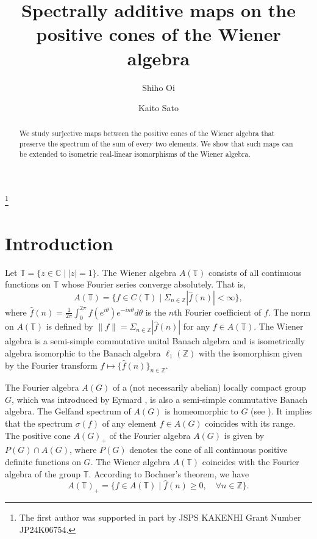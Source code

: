 \documentclass[10pt]{amsart}
\begin{document}
\title[Spectrally additive maps on  the Wiener algebras]{Spectrally additive maps on the positive cones of  the Wiener algebra}

\author[S.Oi]{Shiho Oi}
\address{Department of Mathematics, Faculty of Science, 
Niigata University, Niigata 950-2181, Japan.}

\author[K.Sato]{Kaito Sato}
\address{Graduate School of Science and Technology, 
Niigata University, Niigata 950-2181, Japan.}

\thanks{The first author was supported in part by JSPS KAKENHI Grant Number JP24K06754.
}


\date{}

\begin{abstract}
We study surjective maps between the positive cones of the Wiener algebra that preserve the spectrum of the sum of every two elements. We show that such maps can be extended to isometric real-linear isomorphisms of the Wiener algebra.  
\end{abstract}

\maketitle

\section{Introduction}
Let $\mathbb{T}=\{z \in \mathbb{C} \mid |z|=1\}$. The Wiener algebra  $A(\mathbb{T})$ consists of  all continuous functions on $\mathbb{T}$ whose Fourier series converge absolutely.  That is, 
\[
A(\mathbb{T})=\{ f \in C(\mathbb{T}) \mid \Sigma_{n \in \mathbb{Z}} |\widehat{f}(n)| < \infty \},
\]
where $\widehat{f}(n)=\frac{1}{2\pi}\int_{0}^{2\pi} f(e^{i \theta}) e^{-in \theta} d\theta$ is the $n$th Fourier coefficient of $f$. The norm on $A(\mathbb{T})$ is defined by $\|f\|=\Sigma_{n \in \mathbb{Z}} |\widehat{f}(n)| $ for any $f \in A(\mathbb{T})$. The Wiener algebra is a semi-simple commutative unital Banach algebra and is isometrically algebra isomorphic to the Banach algebra $\ell_1(\mathbb{Z})$ with the isomorphism given by the Fourier transform $f \mapsto \{ \widehat{f}(n)\}_{n \in \mathbb{Z}}$.  

The Fourier algebra $A(G)$ of a (not necessarily abelian) locally compact group $G$, which was introduced by Eymard \cite{E}, is also a semi-simple commutative Banach algebra. The Gelfand spectrum of $A(G)$ is homeomorphic to $G$ (see \cite[Th\'eor\`eme 3.34]{E}). It implies that the spectrum $\sigma(f)$ of any element $f \in A(G)$ coincides with its range. The positive cone $A(G)_{+}$ of the Fourier algebra $A(G)$ is given by $P(G) \cap A(G)$, where $P(G)$ denotes the cone of all continuous positive definite functions on $G$. The Wiener algebra $A(\mathbb{T})$ coincides with the Fourier algebra of the group $\mathbb{T}$. According to Bochner's theorem, we have 
\[
A(\mathbb{T})_{+}=\{ f  \in A(\mathbb{T}) \mid \widehat{f}(n) \ge 0,  \quad \forall n \in \mathbb{Z} \}. 
\]
\end{document}
